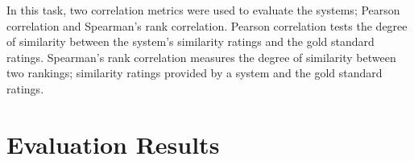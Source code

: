 \documentclass[11pt]{article}
\begin{document}
\begin{table}[hr]
\begin{center}
\end{center}
\caption{\label{table:results-s2p-train} Sentence2phrase subtask scores for the training data.}
\end{table}


In this task, two correlation metrics were used to evaluate the systems; Pearson correlation and Spearman's rank correlation.  Pearson correlation tests the degree of similarity between the system's similarity ratings and the gold standard ratings. Spearman's rank correlation measures the degree of similarity between two rankings; similarity ratings provided by a system and the gold standard
ratings.









\section{Evaluation Results}
\label{evaluation}
\end{document}

